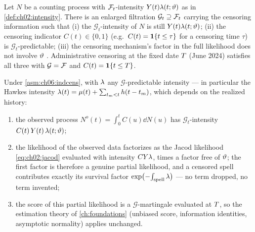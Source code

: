 \begin{assumption}\label{asm:ch06:indcens}
Let $N$ be a counting process with $\mathcal{F}_{t}$-intensity
$Y(t)\lambda(t;\vartheta)$ as in \cref{def:ch02:intensity}. There is an
enlarged filtration $\mathcal{G}_t \supseteq \mathcal{F}_{t}$ carrying the censoring
information such that (i) the $\mathcal{G}_t$-intensity of $N$ is still
$Y(t)\lambda(t;\vartheta)$; (ii) the censoring indicator
$C(t)\in\{0,1\}$ (e.g.\ $C(t)=\mathbf{1}\{t \le \tau\}$ for a censoring time
$\tau$) is $\mathcal{G}_t$-predictable; (iii) the censoring mechanism's
factor in the full likelihood does not involve $\vartheta$
\citep[III.2]{abgk1993}. Administrative censoring at the fixed date
$T$ (June 2024) satisfies all three with $\mathcal{G}=\mathcal{F}$ and
$C(t)=\mathbf{1}\{t\le T\}$.
\end{assumption}

\begin{theorem}\label{thm:ch06:rightcensor}
Under \cref{asm:ch06:indcens}, with $\lambda$ any $\mathcal{G}$-predictable
intensity --- in particular the Hawkes intensity
$\lambda(t) = \mu(t) + \sum_{t_m < t} h(t - t_m)$, which depends on the
realized history:
\begin{enumerate}[label=(\roman*)]
\item the observed process $N^{o}(t) = \int_0^t C(u)\dd N(u)$ has
$\mathcal{G}_t$-intensity $C(t)\,Y(t)\,\lambda(t;\vartheta)$;
\item the likelihood of the observed data factorizes as the Jacod
likelihood \cref{eq:ch02:jacod} evaluated with intensity
$CY\lambda$, times a factor free of $\vartheta$; the first factor is
therefore a genuine partial likelihood, and a censored spell contributes
exactly its survival factor
$\exp\!\big({-}\!\int_{\text{spell}} \lambda\big)$ --- no term dropped, no
term invented;
\item the score of this partial likelihood is a $\mathcal{G}$-martingale
evaluated at $T$, so the estimation theory of \cref{ch:foundations}
(unbiased score, information identities, asymptotic normality) applies
unchanged.
\end{enumerate}
\end{theorem}


